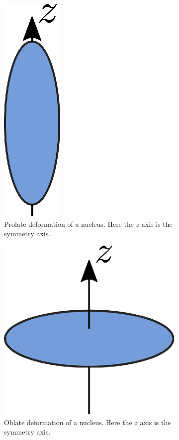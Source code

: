 \documentclass[10pt,a4paper, twoside, openright]{report}
\begin{document}
  \begin{figure}
\centering
\begin{subfigure}[b]{0.48\textwidth}
\centering
\includegraphics{./figures/prolate.eps}
\caption{Prolate deformation of a nucleus. Here the $z$ axis is the symmetry axis.}
\end{subfigure}	
\quad
\begin{subfigure}[b]{0.48\textwidth}
\centering
\includegraphics{./figures/oblate.eps}
\caption{Oblate deformation of a nucleus. Here the $z$ axis is the symmetry axis.}
\end{subfigure}
\caption[Quadrupole deformations of nuclei]{ \label{fig:defnuclei}}
\end{figure}
\end{document}
